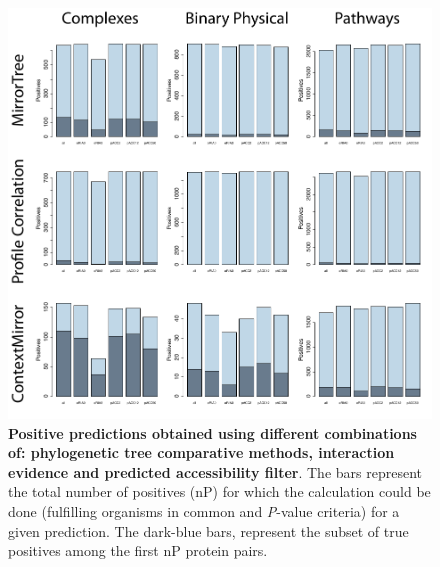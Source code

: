 \begin{figure}[htbp]
\centering
\includegraphics[keepaspectratio,width=\textwidth,height=0.75\textheight]{../figures/accsPositives.pdf}
\caption{\textbf{Positive predictions obtained using different combinations of: phylogenetic tree comparative methods, interaction evidence and predicted accessibility filter}. The bars represent the total number of positives (nP) for which the calculation could be done (fulfilling organisms in common and \emph{P}-value criteria) for a given prediction. The dark-blue bars, represent the subset of true positives among the first nP protein pairs.}
\label{accspositives.pdf}
\end{figure}


